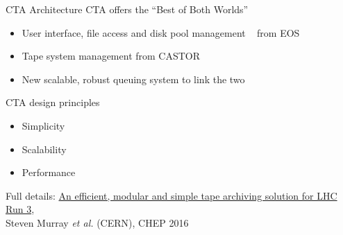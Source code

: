 \documentclass{beamer}
\begin{document}
\begin{frame}{CTA Architecture}{}
   \vspace{2ex}
   {\textcolor{cern@dkblue}{\Large CTA offers the ``Best of Both Worlds''}}\\[1ex]
   \begin{itemize}
      \item User interface, file access and disk pool management ~ from EOS
      \item Tape system management from CASTOR
      \item New scalable, robust queuing system to link the two\\[4ex]
   \end{itemize}
   {\textcolor{cern@dkblue}{\Large CTA design principles}}\\[1ex]
   \begin{itemize}
      \item Simplicity
      \item Scalability
      \item Performance\\[4ex]
   \end{itemize}
   {\scriptsize Full details:
   \href{http://iopscience.iop.org/article/10.1088/1742-6596/898/6/062013/pdf}{\color{cern@ltblue}An
   efficient, modular and simple tape archiving solution for LHC Run 3},\\
   \vspace{-0.8ex}\hspace{5.1em} Steven Murray \textit{et al.} (CERN), CHEP 2016}
\end{frame}
\end{document}
